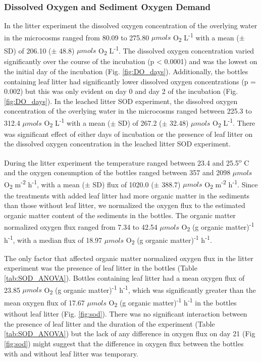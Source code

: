 \subsubsection{Dissolved Oxygen and Sediment Oxygen Demand}
In the litter experiment the dissolved oxygen concentration of the overlying water in the microcosms ranged from 80.09 to 275.80 $\mu mols$ O\textsubscript{2} L\textsuperscript{-1} with a mean ($\pm$ SD) of 206.10 ($\pm$ 48.8) $\mu mols$ O\textsubscript{2} L\textsuperscript{-1}.  The dissolved oxygen concentration varied significantly over the course of the incubation (p < 0.0001) and was the lowest on the initial day of the incubation (Fig. \ref{fig:DO_days}). Additionally, the bottles containing leaf litter had significantly lower dissolved oxygen concentrations (p = 0.002) but this was only evident on day 0 and day 2 of the incubation (Fig. \ref{fig:DO_days}). In the leached litter SOD experiment, the dissolved oxygen concentration of the overlying water in the microcosms ranged between 225.3 to 312.4 $\mu mols$ O\textsubscript{2} L\textsuperscript{-1} with a mean ($\pm$ SD) of 267.2 ($\pm$ 32.48) $\mu mols$ O\textsubscript{2} L\textsuperscript{-1}. There was significant effect of either days of incubation or the presence of leaf litter on the dissolved oxygen concentration in the leached litter SOD experiment. 

During the litter experiment the temperature ranged between 23.4 and 25.5\textsuperscript{o} C and the oxygen consumption of the bottles ranged between 357 and 2098 $\mu mols$ O\textsubscript{2} m\textsuperscript{-2} h\textsuperscript{-1}, with a mean ($\pm$ SD) flux of 1020.0 ($\pm$ 388.7) $\mu mols$ O\textsubscript{2} m\textsuperscript{-2} h\textsuperscript{-1}. Since the treatments with added leaf litter had more organic matter in the sediments than those without leaf litter, we normalized the oxygen flux to the estimated organic matter content of the sediments in the bottles. The organic matter normalized oxygen flux ranged from 7.34 to 42.54 $\mu mols$ O\textsubscript{2} (g organic matter)\textsuperscript{-1} h\textsuperscript{-1}, with a median flux of 18.97 $\mu mols$ O\textsubscript{2} (g organic matter)\textsuperscript{-1} h\textsuperscript{-1}.

The only factor that affected organic matter normalized oxygen flux in the litter experiment was the presence of leaf litter in the bottles (Table \ref{tab:SOD_ANOVA}). Bottles containing leaf litter had a mean oxygen flux of 23.85 $\mu mols$ O\textsubscript{2} (g organic matter)\textsuperscript{-1} h\textsuperscript{-1}, which was significantly greater than the mean oxygen flux of 17.67 $\mu mols$ O\textsubscript{2} (g organic matter)\textsuperscript{-1} h\textsuperscript{-1} in the bottles without leaf litter (Fig. \ref{fig:sod}). There was no significant interaction between the presence of leaf litter and the duration of the experiment (Table \ref{tab:SOD_ANOVA}) but the lack of any difference in oxygen flux on day 21 (Fig \ref{fig:sod}) might suggest that the difference in oxygen flux between the bottles with and without leaf litter was temporary. 

